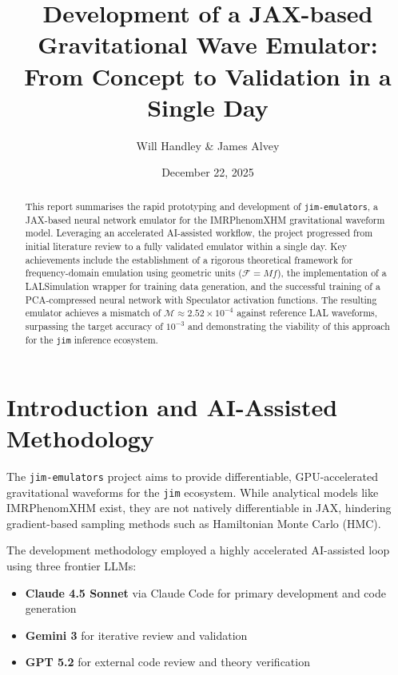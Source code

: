 \documentclass[11pt,a4paper]{article}
\title{\textbf{Development of a JAX-based Gravitational Wave Emulator: \\ From Concept to Validation in a Single Day}}
\author{Will Handley \& James Alvey}
\date{December 22, 2025}
\begin{document}
\maketitle

\begin{abstract}
    This report summarises the rapid prototyping and development of \texttt{jim-emulators}, a JAX-based neural network emulator for the IMRPhenomXHM gravitational waveform model. Leveraging an accelerated AI-assisted workflow, the project progressed from initial literature review to a fully validated emulator within a single day. Key achievements include the establishment of a rigorous theoretical framework for frequency-domain emulation using geometric units ($\mathcal{F}=Mf$), the implementation of a LALSimulation wrapper for training data generation, and the successful training of a PCA-compressed neural network with Speculator activation functions. The resulting emulator achieves a mismatch of $\mathcal{M} \approx 2.52 \times 10^{-4}$ against reference LAL waveforms, surpassing the target accuracy of $10^{-3}$ and demonstrating the viability of this approach for the \texttt{jim} inference ecosystem.
\end{abstract}

\section{Introduction and AI-Assisted Methodology}

The \texttt{jim-emulators} project aims to provide differentiable, GPU-accelerated gravitational waveforms for the \texttt{jim} ecosystem. While analytical models like IMRPhenomXHM exist, they are not natively differentiable in JAX, hindering gradient-based sampling methods such as Hamiltonian Monte Carlo (HMC).

The development methodology employed a highly accelerated AI-assisted loop using three frontier LLMs:
\begin{itemize}
    \item \textbf{Claude 4.5 Sonnet} via Claude Code for primary development and code generation
    \item \textbf{Gemini 3} for iterative review and validation
    \item \textbf{GPT 5.2} for external code review and theory verification
\end{itemize}
\end{document}
